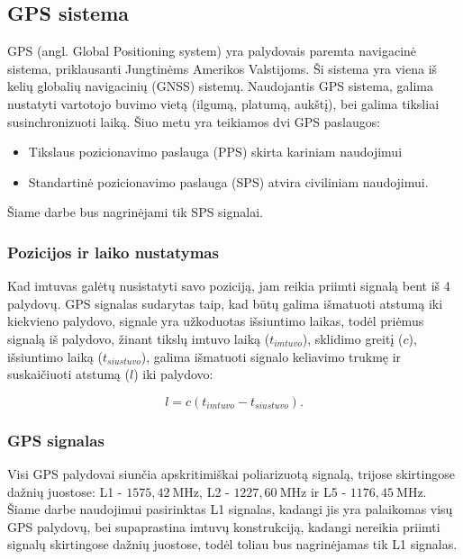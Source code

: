 \documentclass[main.tex]{subfiles}
\begin{document}
\subsection{GPS sistema}

GPS (angl. Global Positioning system) yra palydovais paremta navigacinė
sistema, priklausanti Jungtinėms Amerikos Valstijoms. Ši sistema yra viena
iš kelių globalių navigacinių (GNSS) sistemų. Naudojantis GPS sistema,
galima nustatyti vartotojo buvimo vietą (ilgumą, platumą, aukštį), bei
galima tiksliai susinchronizuoti laiką. Šiuo metu yra teikiamos dvi GPS paslaugos:

\begin{itemize}
    \item Tikslaus pozicionavimo paslauga (PPS)\cite{pps_standard} skirta kariniam naudojimui
    \item Standartinė pozicionavimo paslauga (SPS)\cite{sps_standard}
    atvira civiliniam naudojimui.
\end{itemize}

\noindent Šiame darbe bus nagrinėjami tik SPS signalai.

\subsubsection{Pozicijos ir laiko nustatymas}

Kad imtuvas galėtų nusistatyti savo poziciją, jam reikia priimti signalą bent
iš 4 palydovų. GPS signalas sudarytas taip, kad būtų galima išmatuoti atstumą iki
kiekvieno palydovo, signale yra užkoduotas išsiuntimo laikas, todėl priėmus
signalą iš palydovo, žinant tikslų imtuvo laiką ($t_{imtuvo}$), sklidimo greitį ($c$),
išsiuntimo laiką ($t_{siustuvo}$), galima išmatuoti signalo keliavimo trukmę ir suskaičiuoti
atstumą ($l$) iki palydovo:

\begin{equation}
    l = c (t_{imtuvo} - t_{siustuvo}).
\end{equation}

\subsubsection{GPS signalas}\label{sec:gps_signal}

Visi GPS palydovai siunčia apskritimiškai poliarizuotą signalą, trijose skirtingose
dažnių juostose: L1 - $1575,42\ \mathrm{MHz}$, L2 - $1227,60\ \mathrm{MHz}$ ir
L5 - $1176,45\ \mathrm{MHz}$\cite{sps_standard}. Šiame darbe naudojimui pasirinktas
L1 signalas, kadangi jis yra palaikomas visų GPS palydovų, bei supaprastina imtuvų
konstrukciją, kadangi nereikia priimti signalų skirtingose dažnių juostose, todėl toliau
bus nagrinėjamas tik L1 signalas.
\end{document}
